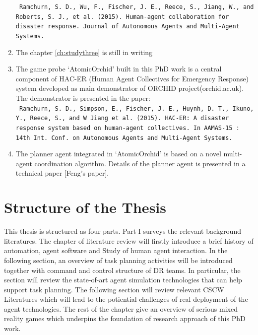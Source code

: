 \begin{enumerate}
\texttt{ Ramchurn, S. D., Wu, F., Fischer, J. E., Reece, S., Jiang, W., and Roberts, S. J., et al. (2015). Human-agent collaboration for disaster response. Journal of Autonomous Agents and Multi-Agent Systems.}\\

\item The chapter \ref{ch:studythree} is still in writing

\item The game probe `AtomicOrchid' built in this PhD work is a central component of HAC-ER (Human Agent Collectives for Emergency Response) system  developed as main demonstrator of ORCHID project(orchid.ac.uk). The demonstrator is presented in the paper:\\

\texttt{  Ramchurn, S. D., Simpson, E., Fischer, J. E., Huynh, D. T., Ikuno, Y., Reece, S., and  W Jiang et al. (2015). HAC-ER: A disaster response system based on human-agent collectives. In AAMAS-15 : 14th Int. Conf. on Autonomous Agents and Multi-Agent Systems.} \\ 


\item The planner agent integrated in `AtomicOrchid' is based on a novel multi-agent coordination algorithm. Details of the planner agent is presented in a technical paper [Feng's paper]. 
\end{enumerate} 














\section{Structure of the Thesis}
This thesis is structured as four parts. Part I surveys the relevant background literatures. The chapter of literature review will firstly introduce a brief history of automation, agent software and Study of human agent interaction. In the following section, an overview of task planning activities will be introduced together with command and control structure of DR teams. In particular, the section will review the state-of-art agent simulation technologies that can help support task planning. The following section will review relevant CSCW Literatures which will lead to the potiential challenges of real deployment of the agent technologies. The rest of the chapter give an overview of serious mixed reality games which underpins the foundation of research approach of this PhD work.\\

